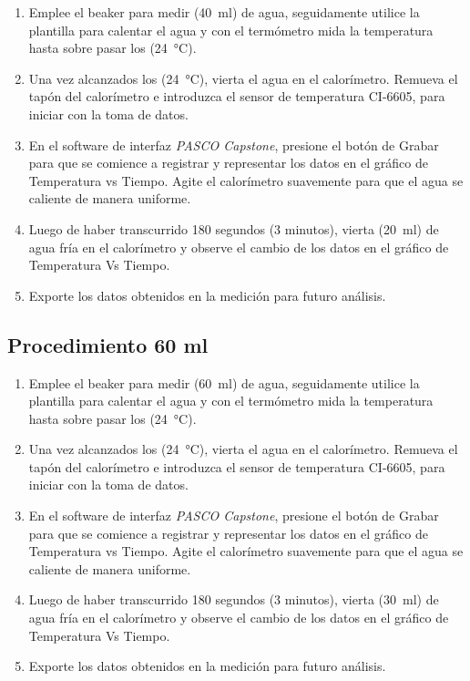 \documentclass[12pt,letterpaper]{report}
\begin{document}
\begin{enumerate}
    \item Emplee el beaker para medir (\SI{40}{\ml}) de agua, seguidamente utilice la  plantilla para calentar el agua y con el termómetro mida la temperatura hasta sobre pasar los (\SI{24}{\celsius}).
    \item Una vez alcanzados los (\SI{24}{\celsius}), vierta el agua en el calorímetro. Remueva el tapón del calorímetro e introduzca el sensor de temperatura CI-6605, para iniciar con la toma de datos. 
    \item En el software de interfaz \textit{PASCO Capstone}, presione el botón de Grabar para que se comience a registrar y representar los datos en el gráfico de Temperatura vs Tiempo. Agite el calorímetro suavemente para que el agua se caliente de manera uniforme.
    \item Luego de haber transcurrido 180 segundos (3 minutos), vierta (\SI{20}{\ml})  de agua fría en el calorímetro y observe el cambio de los datos en el gráfico de Temperatura Vs Tiempo.
    \item Exporte los datos obtenidos en la medición para futuro análisis.
\end{enumerate}

\subsection{Procedimiento 60 ml}
\begin{enumerate}
    \item Emplee el beaker para medir (\SI{60}{\ml}) de agua, seguidamente utilice la  plantilla para calentar el agua y con el termómetro mida la temperatura hasta sobre pasar los (\SI{24}{\celsius}).
    \item Una vez alcanzados los (\SI{24}{\celsius}), vierta el agua en el calorímetro. Remueva el tapón del calorímetro e introduzca el sensor de temperatura CI-6605, para iniciar con la toma de datos. 
    \item En el software de interfaz \textit{PASCO Capstone}, presione el botón de Grabar para que se comience a registrar y representar los datos en el gráfico de Temperatura vs Tiempo. Agite el calorímetro suavemente para que el agua se caliente de manera uniforme.
    \item Luego de haber transcurrido 180 segundos (3 minutos), vierta (\SI{30}{\ml})  de agua fría en el calorímetro y observe el cambio de los datos en el gráfico de Temperatura Vs Tiempo.
    \item Exporte los datos obtenidos en la medición para futuro análisis.
\end{enumerate}
\end{document}
